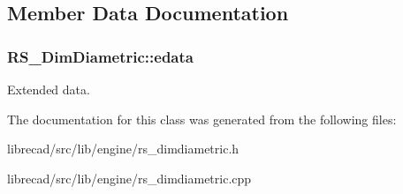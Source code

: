 \subsection{Member Data Documentation}
\hypertarget{classRS__DimDiametric_ab9ac641aca6e2777516d841eba663bc1}{
\subsubsection[{edata}]{ R\-S\-\_\-\-Dim\-Diametric\-::edata\hspace{0.3cm}{\ttfamily [protected]}}}\label{classRS__DimDiametric_ab9ac641aca6e2777516d841eba663bc1}
Extended data. 

The documentation for this class was generated from the following files\-:\begin{DoxyCompactItemize}
\item 
librecad/src/lib/engine/rs\-\_\-dimdiametric.\-h\item 
librecad/src/lib/engine/rs\-\_\-dimdiametric.\-cpp\end{DoxyCompactItemize}
